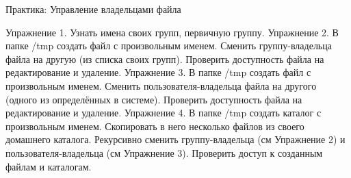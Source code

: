 \begin{frame}{Практика: Управление владельцами файла}
  
  \alert{Упражнение 1.} Узнать имена своих групп, первичную группу.\newline
  \alert{Упражнение 2.} В папке /tmp создать файл с произвольным именем. 
  Сменить группу-владельца файла на другую (из списка своих групп). 
  Проверить доступность файла на редактирование и удаление.\newline
  \alert{Упражнение 3.} В папке /tmp создать файл с произвольным именем.
  Сменить пользователя-владельца файла на другого (одного из определённых в системе).  Проверить доступность файла на редактирование и удаление. \newline
  \alert{Упражнение 4.} В папке /tmp создать каталог с произвольным именем. Скопировать в него несколько файлов из своего домашнего каталога. Рекурсивно сменить группу-владельца (см Упражнение 2) и пользователя-владельца (см Упражнение 3). Проверить доступ к созданным файлам и каталогам.

\end{frame}

